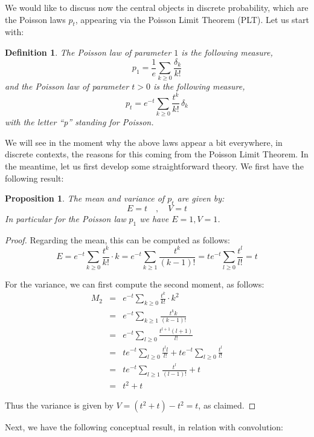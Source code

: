 \documentclass[12pt]{amsbook}
\newtheorem{definition}[theorem]{Definition}
\newtheorem{proposition}[theorem]{Proposition}
\begin{document}
We would like to discuss now the central objects in discrete probability, which are the Poisson laws $p_t$, appearing via the Poisson Limit Theorem (PLT). Let us start with:


\begin{definition}
The Poisson law of parameter $1$ is the following measure,
$$p_1=\frac{1}{e}\sum_{k\geq0}\frac{\delta_k}{k!}$$
and the Poisson law of parameter $t>0$ is the following measure,
$$p_t=e^{-t}\sum_{k\geq0}\frac{t^k}{k!}\,\delta_k$$
with the letter ``p'' standing for Poisson.
\end{definition}

We will see in the moment why the above laws appear a bit everywhere, in discrete contexts, the reasons for this coming from the Poisson Limit Theorem. In the meantime, let us first develop some straightforward theory. We first have the following result:


\begin{proposition}
The mean and variance of $p_t$ are given by:
$$E=t\quad,\quad V=t$$
In particular for the Poisson law $p_1$ we have $E=1,V=1$.
\end{proposition}

\begin{proof}
Regarding the mean, this can be computed as follows:
$$E
=e^{-t}\sum_{k\geq0}\frac{t^k}{k!}\cdot k
=e^{-t}\sum_{k\geq1}\frac{t^k}{(k-1)!}
=te^{-t}\sum_{l\geq0}\frac{t^l}{l!}
=t$$

For the variance, we can first compute the second moment, as follows:
\begin{eqnarray*}
M_2
&=&e^{-t}\sum_{k\geq0}\frac{t^k}{k!}\cdot k^2\\
&=&e^{-t}\sum_{k\geq1}\frac{t^kk}{(k-1)!}\\
&=&e^{-t}\sum_{l\geq0}\frac{t^{l+1}(l+1)}{l!}\\
&=&te^{-t}\sum_{l\geq0}\frac{t^ll}{l!}+te^{-t}\sum_{l\geq0}\frac{t^l}{l!}\\
&=&te^{-t}\sum_{l\geq1}\frac{t^l}{(l-1)!}+t\\
&=&t^2+t
\end{eqnarray*}

Thus the variance is given by $V=(t^2+t)-t^2=t$, as claimed.
\end{proof}

Next, we have the following conceptual result, in relation with convolution:
\end{document}
